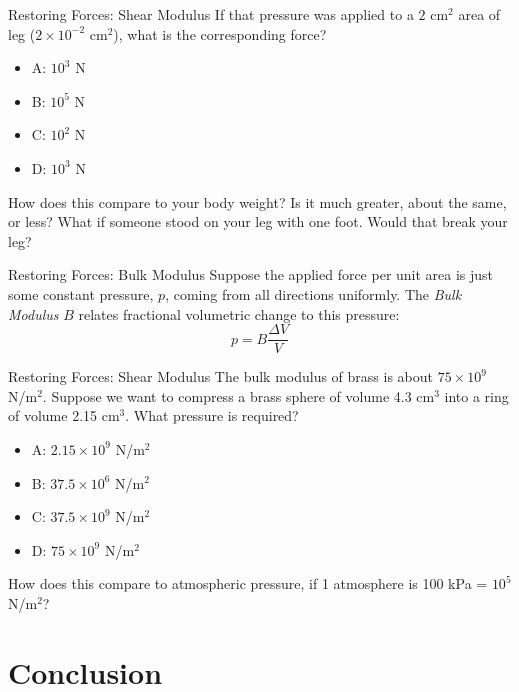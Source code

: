 \documentclass{beamer}
\begin{document}
\begin{frame}{Restoring Forces: Shear Modulus}
If that pressure was applied to a $2$ cm$^2$ area of leg ($2 \times 10^{-2}$ cm$^2$), what is the corresponding force?
\begin{itemize}
\item A: $10^{3}$ N
\item B: $10^{5}$ N
\item C: $10^{2}$ N
\item D: $10^{3}$ N
\end{itemize}
How does this compare to your body weight? Is it much greater, about the same, or less?  What if someone stood on your leg with one foot.  Would that break your leg?
\end{frame}

\begin{frame}{Restoring Forces: Bulk Modulus}
Suppose the applied force per unit area is just some constant pressure, $p$, coming from all directions uniformly.  The \textit{Bulk Modulus} $B$ relates fractional volumetric change to this pressure: \\
\begin{equation}
p = B\frac{\Delta V}{V}
\end{equation}
\end{frame}

\begin{frame}{Restoring Forces: Shear Modulus}
The bulk modulus of brass is about $75 \times 10^{9}$ N/m$^2$.  Suppose we want to compress a brass sphere of volume 4.3 cm$^3$ into a ring of volume 2.15 cm$^3$.  What pressure is required?
\begin{itemize}
\item A: $2.15 \times 10^{9}$ N/m$^2$ 
\item B: $37.5 \times 10^{6}$ N/m$^2$ 
\item C: $37.5 \times 10^{9}$ N/m$^2$ 
\item D: $75 \times 10^{9}$ N/m$^2$ 
\end{itemize}
How does this compare to atmospheric pressure, if 1 atmosphere is 100 kPa = $10^5$ N/m$^2$?
\end{frame}

\section{Conclusion}
\end{document}

